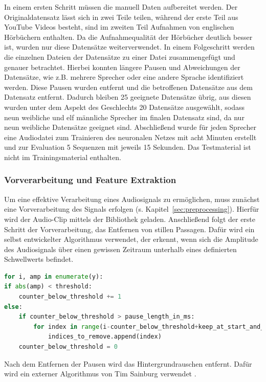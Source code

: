 In einem ersten Schritt müssen die manuell Daten aufbereitet werden.
Der Originaldatensatz lässt sich in zwei Teile teilen, während der erste Teil aus YouTube Videos besteht, sind im zweiten Teil Aufnahmen von englischen Hörbüchern enthalten.
Da die Aufnahmequalität der Hörbücher deutlich besser ist, wurden nur diese Datensätze weiterverwendet.
In einem Folgeschritt werden die einzelnen Dateien der Datensätze zu einer Datei zusammengefügt und genauer betrachtet.
Hierbei konnten längere Pausen und Abweichungen der Datensätze, wie z.B. mehrere Sprecher oder eine andere Sprache identifiziert werden.
Diese Pausen wurden entfernt und die betroffenen Datensätze aus dem Datensatz entfernt.
Dadurch bleiben 25 geeignete Datensätze übrig, aus diesen wurden unter dem Aspekt des Geschlechts 20 Datensätze ausgewählt, sodass neun weibliche und elf männliche Sprecher im finalen Datensatz sind, da nur neun weibliche Datensätze geeignet sind.
Abschließend wurde für jeden Sprecher eine Audiodatei zum Trainieren des neuronalen Netzes mit acht Minuten erstellt und zur Evaluation 5 Sequenzen mit jeweils 15 Sekunden.
Das Testmaterial ist nicht im Trainingsmaterial enthalten.

\subsubsection{Vorverarbeitung und Feature Extraktion}

Um eine effektive Verarbeitung eines Audiosignals zu ermöglichen, muss zunächst eine Vorverarbeitung des Signals erfolgen (s. Kapitel~\ref{sec:preprocessing}).
Hierfür wird der Audio-Clip mittels der Bibliothek  geladen.
Anschließend folgt der erste Schritt der Vorverarbeitung, das Entfernen von stillen Passagen.
Dafür wird ein selbst entwickelter Algorithmus verwendet, der erkennt, wenn sich die Amplitude des Audiosignals über einen gewissen Zeitraum unterhalb eines definierten Schwellwerts befindet.

\begin{lstlisting}[language=Python,numbers=none,caption=Remove Silence,label=lst-remove-silence]
for i, amp in enumerate(y):
if abs(amp) < threshold:
    counter_below_threshold += 1
else:
    if counter_below_threshold > pause_length_in_ms:
        for index in range(i-counter_below_threshold+keep_at_start_and_end, i-keep_at_start_and_end):
            indices_to_remove.append(index)
    counter_below_threshold = 0
\end{lstlisting}

Nach dem Entfernen der Pausen wird das Hintergrundrauschen entfernt.
Dafür wird ein externer Algorithmus von Tim Sainburg verwendet \autocite[][]{sainburg_timsainbnoisereduce_2019}.

